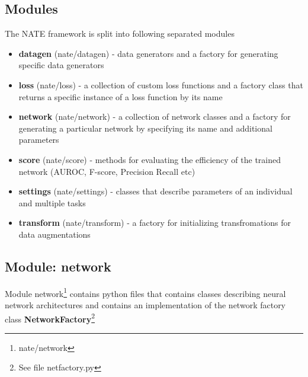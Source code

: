 \documentclass[a4paper, 11pt]{article}
\begin{document}
\subsection{Modules}
The NATE framework is split into following separated modules
\begin{itemize}
    \item \textbf{datagen} (nate/datagen) - data generators and a factory for generating specific data generators
    \item \textbf{loss} (nate/loss) - a collection of custom loss functions and a factory class that returns a specific instance of a loss function by its name
    \item \textbf{network} (nate/network) - a collection of network classes and a factory for generating a particular network by specifying its name and additional parameters
    \item \textbf{score} (nate/score) - methods for evaluating the efficiency of the trained network (AUROC, F-score, Precision Recall etc)
    \item \textbf{settings} (nate/settings) - classes that describe parameters of an individual and multiple tasks
    \item \textbf{transform} (nate/transform) - a factory for initializing transfromations for data augmentations
\end{itemize}

\subsection{Module: network}
Module network\footnote{nate/network} contains python files that contains classes describing neural network architectures and contains an implementation of the network factory class \textbf{NetworkFactory}\footnote{See file netfactory.py}
\end{document}
